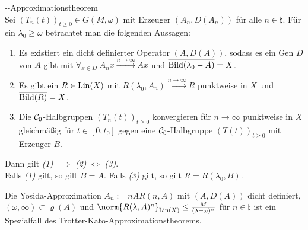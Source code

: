 \begin{Satz}{--Approximationstheorem}\\
    Sei $(T_n(t))_{t \ge 0} \in G(M, \omega)$ mit Erzeuger $(A_n, D(A_n))$ für alle
    $n \in \natural$.
    Für ein $\lambda_0 \ge \omega$ betrachtet man die folgenden Aussagen:
    \begin{enumerate}
        \item
        Es existiert ein dicht definierter Operator $(A, D(A))$, sodass es ein Gen $D$
        von $A$ gibt mit $\forall_{x \in D}\; A_n x \xrightarrow{n \to \infty} Ax$ und
        $\overline{\text{Bild}(\lambda_0 - A)} = X$.

        \item
        Es gibt ein $R \in \operatorname{Lin}(X)$ mit $R(\lambda_0, A_n) \xrightarrow{n \to \infty} R$
        punktweise in $X$ und $\overline{\text{Bild}(R)} = X$.

        \item
        Die $\mathcal{C}_0$-Halbgruppen $(T_n(t))_{t \ge 0}$ konvergieren für $n \to \infty$ punktweise
        in $X$ gleichmäßig für $t \in [0, t_0]$ gegen eine $\mathcal{C}_0$-Halbgruppe $(T(t))_{t \ge 0}$
        mit Erzeuger $B$.
    \end{enumerate}
    Dann gilt \emph{(1)} $\implies$ \emph{(2)} $\iff$ \emph{(3)}.\\
    Falls \emph{(1)} gilt, so gilt $B = \overline{A}$.
    Falls \emph{(3)} gilt, so gilt $R = R(\lambda_0, B)$.
\end{Satz}

\begin{Bsp}
    Die Yosida-Approximation $A_n := nA R(n, A)$ mit
    $(A, D(A))$ dicht definiert,\\
    $(\omega, \infty) \subset \varrho(A)$ und
    $\norm{R(\lambda, A)^n}_{\Lin(X)} \le \frac{M}{(\lambda - \omega)^n}$ für $n \in \natural$
    ist ein Spezialfall des Trotter-Kato-Approximationstheorems.
\end{Bsp}

\linie


